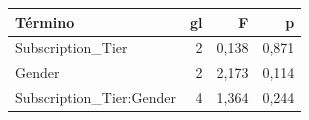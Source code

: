 \begin{tabular}{lrrr}
\toprule
Término & gl & F & p \\
\midrule
Subscription\_Tier & 2 & 0,138 & 0,871 \\
Gender & 2 & 2,173 & 0,114 \\
Subscription\_Tier:Gender & 4 & 1,364 & 0,244 \\
\bottomrule
\end{tabular}

